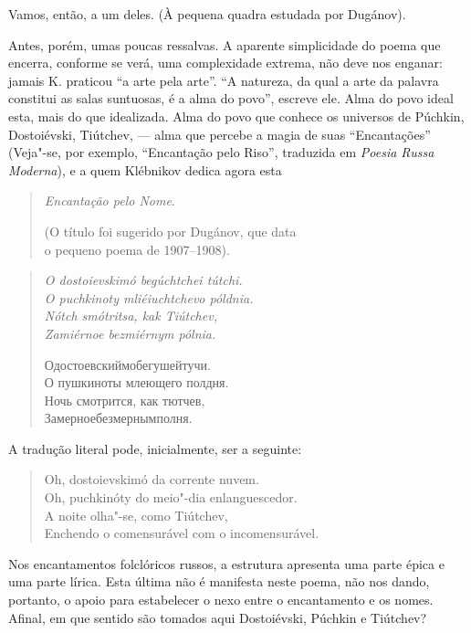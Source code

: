 Vamos, então, a um deles. (À pequena quadra estudada por Dugánov).

Antes, porém, umas poucas ressalvas. A aparente simplicidade do poema
que encerra, conforme se verá, uma complexidade extrema, não deve nos
enganar: jamais K. praticou ``a arte pela arte''. ``A natureza, da qual
a arte da palavra constitui as salas suntuosas, é a alma do povo'',
escreve ele. Alma do povo ideal esta, mais do que idealizada. Alma do
povo que conhece os universos de Púchkin, Dostoiévski, Tiútchev, --- alma
que percebe a magia de suas ``Encantações'' (Veja"-se, por exemplo, ``Encantação pelo Riso'', traduzida em \emph{Poesia Russa Moderna}), e
a quem Klébnikov dedica agora esta

\begin{verse}
\emph{Encantação pelo Nome}. 

(O título foi sugerido por Dugánov, que data \\
o pequeno poema de 1907--1908). 
\end{verse}

\begin{verse}
\emph{O dostoievskimó begúchtchei tútchi.} \\
\emph{O puchkinoty mliéiuchtchevo póldnia.} \\
\emph{Nótch smótritsa, kak Tiútchev,} \\
\emph{Zamiérnoe bezmiérnym pólnia.} 

Одостоевскиймобегушейтучи. \\
О пушкиноты млеющего полдня. \\
Ночь смотрится, как тютчев, \\
Замерноебезмернымполня.
\end{verse}

A tradução literal pode, inicialmente, ser a seguinte:

\begin{verse}
Oh, dostoievskimó da corrente nuvem. \\
Oh, puchkinóty do meio"-dia \qb{}enlanguescedor. \\
A noite olha"-se, como Tiútchev, \\
Enchendo o comensurável com \qb{}o incomensurável.
\end{verse}

Nos encantamentos folclóricos russos, a estrutura apresenta uma parte
épica e uma parte lírica. Esta última não é manifesta neste poema, não
nos dando, portanto, o apoio para estabelecer o nexo entre o encantamento
e os nomes. Afinal, em que sentido são tomados aqui Dostoiévski, Púchkin
e Tiútchev?


